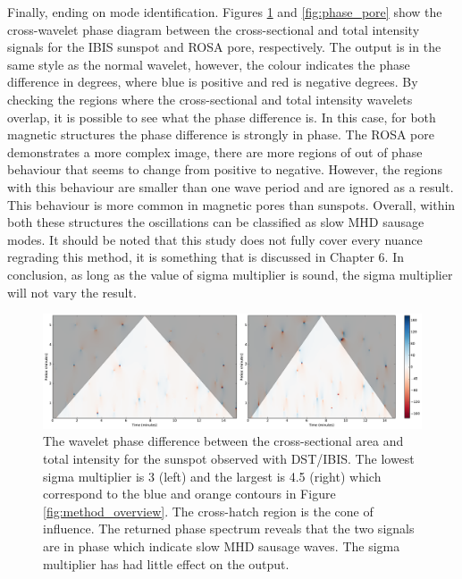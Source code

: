 	Finally, ending on mode identification.
	Figures \ref{fig:phase_sunspot} and \ref{fig:phase_pore} show the cross-wavelet phase diagram between the cross-sectional and total intensity signals for the IBIS sunspot and ROSA pore, respectively.
	The output is in the same style as the normal wavelet, however, the colour indicates the phase difference in degrees, where blue is positive and red is negative degrees.
	By checking the regions where the cross-sectional and total intensity wavelets overlap, it is possible to see what the phase difference is.
	In this case, for both magnetic structures the phase difference is strongly in phase. 
	The ROSA pore demonstrates a more complex image, there are more regions of out of phase behaviour that seems to change from positive to negative.
	However, the regions with this behaviour are smaller than one wave period and are ignored as a result.    
	This behaviour is more common in magnetic pores than sunspots.
	Overall, within both these structures the oscillations can be classified as slow MHD sausage modes. 
	It should be noted that this study does not fully cover every nuance regrading this method, it is something that is discussed in Chapter 6.   
	In conclusion, as long as the value of sigma multiplier is sound, the sigma multiplier will not vary the result.
	    
	\begin{figure}
    	\centering
    	\includegraphics[width=1\textwidth]{sunspot_phase.pdf}
    	\caption{
			            The wavelet phase difference between the cross-sectional area and total intensity for the sunspot observed with DST/IBIS.
			            The lowest sigma multiplier is 3 (left) and the largest is 4.5 (right) which correspond to the blue and orange contours in Figure \ref{fig:method_overview}.
			            The cross-hatch region is the cone of influence.
						The returned phase spectrum reveals that the two signals are in phase which indicate slow MHD sausage waves.
						The sigma multiplier has had little effect on the output.
    	             }
    	\label{fig:phase_sunspot}
    \end{figure}
 
